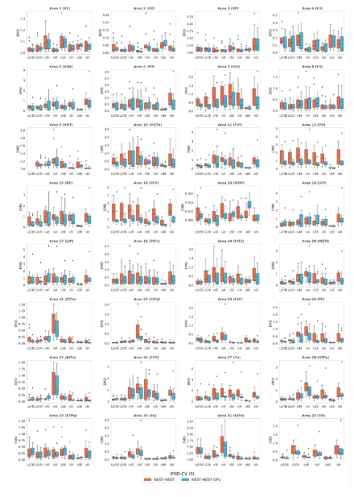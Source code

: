 \documentclass[a4paper, 12pt, twoside, openright]{book}
\begin{document}
\begin{figure}[H]
    \centering
    \includegraphics[width=\columnwidth]{figures/emd_boxplot_vert_ms_CV_ISI.pdf}
\end{figure}
\end{document}
